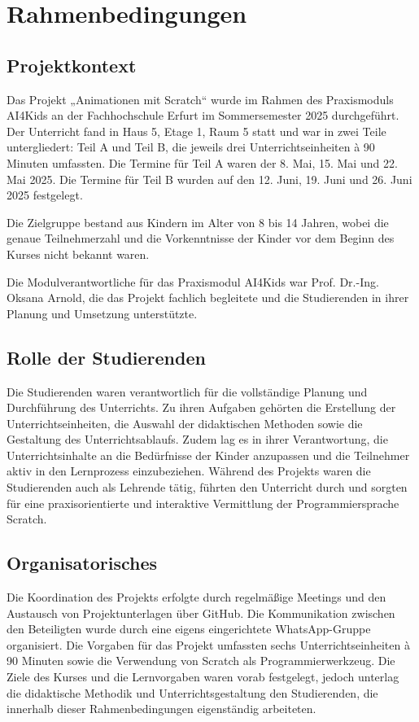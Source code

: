 \chapter{Rahmenbedingungen}
\label{sec: Rahmenbedingungen}

\section{Projektkontext}
\label{sec:Projektkontext}

Das Projekt „Animationen mit Scratch“ wurde im Rahmen des Praxismoduls AI4Kids an der Fachhochschule Erfurt im Sommersemester 2025 durchgeführt. Der Unterricht fand in Haus 5, Etage 1, Raum 5 statt und war in zwei Teile untergliedert: Teil A und Teil B, die jeweils drei Unterrichtseinheiten à 90 Minuten umfassten. Die Termine für Teil A waren der 8. Mai, 15. Mai und 22. Mai 2025. Die Termine für Teil B wurden auf den 12. Juni, 19. Juni und 26. Juni 2025 festgelegt.

Die Zielgruppe bestand aus Kindern im Alter von 8 bis 14 Jahren, wobei die genaue Teilnehmerzahl und die Vorkenntnisse der Kinder vor dem Beginn des Kurses nicht bekannt waren.

Die Modulverantwortliche für das Praxismodul AI4Kids war Prof. Dr.-Ing. Oksana Arnold, die das Projekt fachlich begleitete und die Studierenden in ihrer Planung und Umsetzung unterstützte.
\section{Rolle der Studierenden}
\label{sec:Rolle der Studierenden}

Die Studierenden waren verantwortlich für die vollständige Planung und Durchführung des Unterrichts. Zu ihren Aufgaben gehörten die Erstellung der Unterrichtseinheiten, die Auswahl der didaktischen Methoden sowie die Gestaltung des Unterrichtsablaufs. Zudem lag es in ihrer Verantwortung, die Unterrichtsinhalte an die Bedürfnisse der Kinder anzupassen und die Teilnehmer aktiv in den Lernprozess einzubeziehen. Während des Projekts waren die Studierenden auch als Lehrende tätig, führten den Unterricht durch und sorgten für eine praxisorientierte und interaktive Vermittlung der Programmiersprache Scratch.
\section{Organisatorisches}
\label{sec:Organisatorisches}
Die Koordination des Projekts erfolgte durch regelmäßige Meetings und den Austausch von Projektunterlagen über GitHub. Die Kommunikation zwischen den Beteiligten wurde durch eine eigens eingerichtete WhatsApp-Gruppe organisiert. Die Vorgaben für das Projekt umfassten sechs Unterrichtseinheiten à 90 Minuten sowie die Verwendung von Scratch als Programmierwerkzeug. Die Ziele des Kurses und die Lernvorgaben waren vorab festgelegt, jedoch unterlag die didaktische Methodik und Unterrichtsgestaltung den Studierenden, die innerhalb dieser Rahmenbedingungen eigenständig arbeiteten.